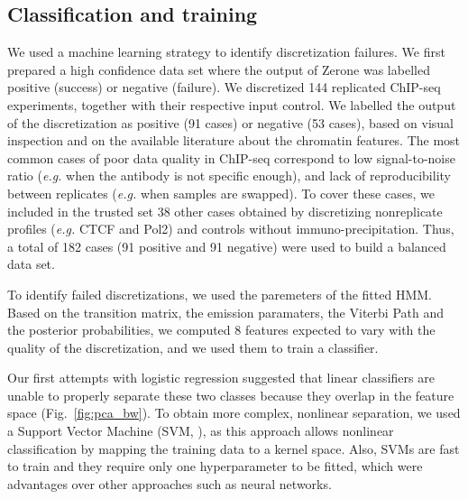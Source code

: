 \documentclass{bioinfo}
\begin{document}
\begin{methods}
\subsection{Classification and training}
\label{sub:training}
We used a machine learning strategy to identify discretization
failures. We first prepared a high confidence data set where the
output of Zerone was labelled positive (success) or negative (failure).
We discretized 144 replicated ChIP-seq experiments, together with their
respective input control.
We labelled the output of the discretization as positive (91 cases)
or negative (53 cases), based on visual inspection and on the available
literature about the chromatin features. The most common cases of
poor data quality in ChIP-seq correspond to low signal-to-noise ratio
(\textit{e.g.} when the antibody is not specific enough), and lack of
reproducibility between replicates (\textit{e.g.} when samples are
swapped). To cover these cases, we included in the trusted set
38 other cases obtained by discretizing nonreplicate profiles
(\textit{e.g.} CTCF and Pol2) and controls without immuno-precipitation.
Thus, a total of 182 cases (91 positive and 91 negative) were used to
build a balanced data set.

To identify failed discretizations, we used the paremeters of the
fitted HMM. Based on the transition matrix, the emission paramaters,
the Viterbi Path and the posterior probabilities,
we computed 8 features expected to vary with the quality
of the discretization, and we used them to train a classifier.

Our first attempts with logistic regression suggested that linear
classifiers are unable to properly separate these two classes because
they overlap in the feature space (Fig.~\ref{fig:pca_bw}). To obtain more
complex, nonlinear separation, we used a Support Vector Machine
(SVM, \citealp{Chang2011,e1071}), as this approach
allows nonlinear classification by mapping
the training data to a kernel space. Also, SVMs are fast to train and
they require only one hyperparameter to be fitted, which were
advantages over other approaches such as neural networks.


\end{methods}
\end{document}
